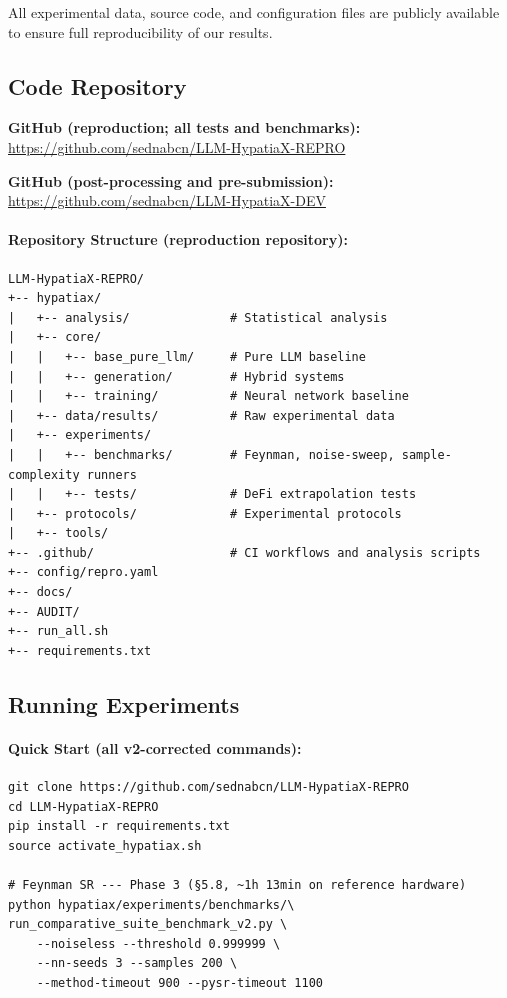 \documentclass[twoside,11pt]{article}
\begin{document}
All experimental data, source code, and configuration files are publicly
available to ensure full reproducibility of our results.

\subsection{Code Repository}

\textbf{GitHub (reproduction; all tests and benchmarks):}
\url{https://github.com/sednabcn/LLM-HypatiaX-REPRO}

\textbf{GitHub (post-processing and pre-submission):}
\url{https://github.com/sednabcn/LLM-HypatiaX-DEV}

\paragraph{Repository Structure (reproduction repository):}
\begin{small}
\begin{verbatim}
LLM-HypatiaX-REPRO/
+-- hypatiax/
|   +-- analysis/              # Statistical analysis
|   +-- core/
|   |   +-- base_pure_llm/     # Pure LLM baseline
|   |   +-- generation/        # Hybrid systems
|   |   +-- training/          # Neural network baseline
|   +-- data/results/          # Raw experimental data
|   +-- experiments/
|   |   +-- benchmarks/        # Feynman, noise-sweep, sample-complexity runners
|   |   +-- tests/             # DeFi extrapolation tests
|   +-- protocols/             # Experimental protocols
|   +-- tools/
+-- .github/                   # CI workflows and analysis scripts
+-- config/repro.yaml
+-- docs/
+-- AUDIT/
+-- run_all.sh
+-- requirements.txt
\end{verbatim}
\end{small}

\subsection{Running Experiments}

\paragraph{Quick Start (all v2-corrected commands):}
\begin{small}
\begin{verbatim}
git clone https://github.com/sednabcn/LLM-HypatiaX-REPRO
cd LLM-HypatiaX-REPRO
pip install -r requirements.txt
source activate_hypatiax.sh

# Feynman SR --- Phase 3 (§5.8, ~1h 13min on reference hardware)
python hypatiax/experiments/benchmarks/\
run_comparative_suite_benchmark_v2.py \
    --noiseless --threshold 0.999999 \
    --nn-seeds 3 --samples 200 \
    --method-timeout 900 --pysr-timeout 1100
\end{verbatim}
\end{small}
\end{document}
